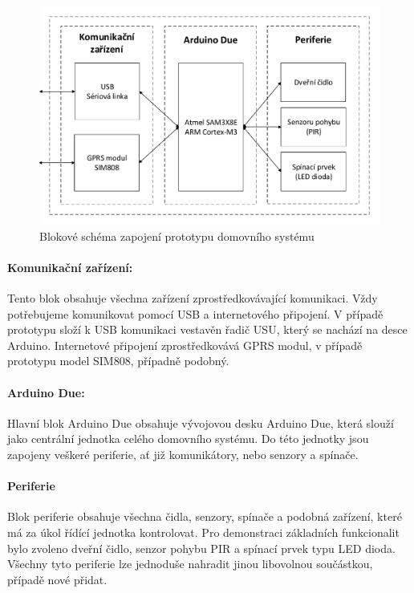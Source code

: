 \documentclass[FM,DP]{tulthesis}  %
\begin{document}
\begin{figure}[H]
\begin{center}
\includegraphics[width=\textwidth]{vector/blokoveSchemaHardware.pdf}
\caption{Blokové schéma zapojení prototypu domovního systému}
\label{image}
\end{center}
\end{figure}

\paragraph{Komunikační zařízení:}
Tento blok obsahuje všechna zařízení zprostředkovávající komunikaci. Vždy potřebujeme komunikovat pomocí USB a internetového připojení. V případě prototypu složí k USB komunikaci vestavěn řadič USU, který se nachází na desce Arduino. Internetové připojení zprostředkovává GPRS modul, v případě prototypu model SIM808, případně podobný.

\paragraph{Arduino Due:}
Hlavní blok Arduino Due obsahuje vývojovou desku Arduino Due, která slouží jako centrální jednotka celého domovního systému. Do této jednotky jsou zapojeny veškeré periferie, ať již komunikátory, nebo senzory a spínače.

\paragraph{Periferie}
Blok periferie obsahuje všechna čidla, senzory, spínače a podobná zařízení, které má za úkol řídící jednotka kontrolovat. Pro demonstraci základních funkcionalit bylo zvoleno dveřní čidlo, senzor pohybu PIR a spínací prvek typu LED dioda. Všechny tyto periferie lze jednoduše nahradit jinou libovolnou součástkou, případě nové přidat.
\end{document}
